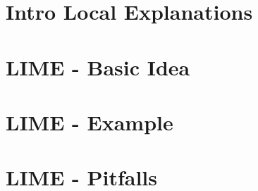 \documentclass[11pt,compress,t,notes=noshow, aspectratio=169, xcolor=table]{beamer}
\begin{document}



% 
% 
% 

\section{Intro Local Explanations}


\section{LIME - Basic Idea}


\section{LIME - Example}


\section{LIME - Pitfalls}

\end{document}
